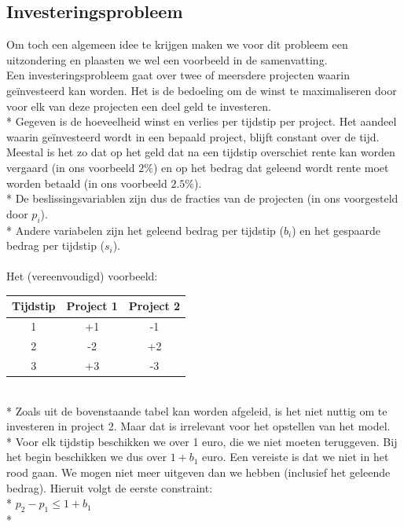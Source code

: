 \documentclass[10pt]{article}
\begin{document}
\subsection{Investeringsprobleem}
Om toch een algemeen idee te krijgen maken we voor dit probleem een uitzondering en plaasten we wel een voorbeeld in de samenvatting.\\
Een investeringsprobleem gaat over twee of meersdere projecten waarin ge\"investeerd kan worden. Het is de bedoeling om de winst te maximaliseren door voor elk van deze projecten een deel geld te investeren.\\*
Gegeven is de hoeveelheid winst en verlies per tijdstip per project. Het aandeel waarin ge\"investeerd wordt in een bepaald project, blijft constant over de tijd. Meestal is het zo dat op het geld dat na een tijdstip overschiet rente kan worden vergaard (in ons voorbeeld $2\%$) en op het bedrag dat geleend wordt rente moet worden betaald (in ons voorbeeld $2.5\%$).\\*
De beslissingsvariablen zijn dus de fracties van de projecten (in ons voorgesteld door $p_i$).\\*
Andere variabelen zijn het geleend bedrag per tijdstip ($b_i$) en het gespaarde bedrag per tijdstip ($s_i$).\\\\
Het (vereenvoudigd) voorbeeld:
\begin{table}[!h]
\begin{center}
\begin{tabular}{| c | c | c |} \hline
Tijdstip & Project 1 & Project 2\\ \hline
1 & +1 & -1 \\ \hline
2 & -2 & +2 \\ \hline
3 & +3 & -3 \\ \hline
\end{tabular}
\end{center}
\end{table}
\\*
Zoals uit de bovenstaande tabel kan worden afgeleid, is het niet nuttig om te investeren in project 2. Maar dat is irrelevant voor het opstellen van het model.\\*
Voor elk tijdstip beschikken we over 1 euro, die we niet moeten teruggeven. Bij het begin beschikken we dus over $1+b_1$ euro. Een vereiste is dat we niet in het rood gaan. We mogen niet meer uitgeven dan we hebben (inclusief het geleende bedrag). Hieruit volgt de eerste constraint:\\*
$p_2-p_1 \le 1+b_1$\\*
\end{document}
